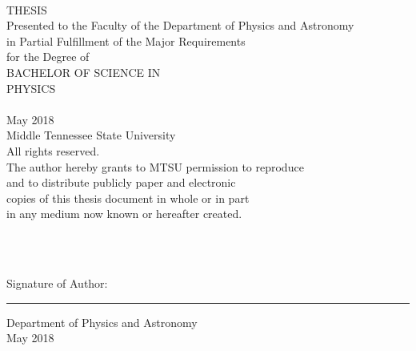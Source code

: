 \begin{titlepage}
    \begin{center}
        \fontsize{14pt}{16.8pt}\selectfont \theTitle\\
        \vspace{48pt}
        \fontsize{12pt}{14.4pt}\selectfont
        THESIS\\
        \vspace{60pt}
        Presented to the Faculty of the Department of Physics and Astronomy\\
        in Partial Fulfillment of the Major Requirements\\
        for the Degree of\\
        \vspace{36pt}
        BACHELOR OF SCIENCE IN\\
        PHYSICS\\
        \vspace{72pt}
        \theAuthor\\
        \vspace{60pt}
        May 2018\\
        \vspace{60pt}
         Middle Tennessee State University\\
        All rights reserved.\\
        \vspace{12pt}
        \fontsize{9pt}{10.8pt}\selectfont
        The author hereby grants to MTSU permission to reproduce\\
        and to distribute publicly paper and electronic\\
        copies of this thesis document in whole or in part\\
        in any medium now known or hereafter created.
    \end{center}
\end{titlepage}
\thispagestyle{empty}

\clearpage

\vspace*{24pt}
\begin{center}
    \fontsize{12pt}{14.4pt}\selectfont
    \theTitlecaps\\
    \vspace{24pt}
    \theAuthor\\
    \vspace{216pt}
\end{center}
\begin{flushleft}
    Signature of Author:
    \vspace{4pt}\hrule\vspace{4pt}
    \raggedleft
    \fontsize{10pt}{12pt}\selectfont
    Department of Physics and Astronomy\\
    May 2018\\
\end{flushleft}
\vspace{36pt}


